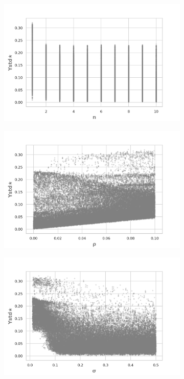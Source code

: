 \documentclass{article}
\begin{document}
\begin{figure}[H]
    \begin{subfigure}[b]{0.45\textwidth}
      \includegraphics[width=\textwidth]{img/regressionYstd*n.png}
    \end{subfigure}
    \begin{subfigure}[b]{0.45\textwidth}
      \includegraphics[width=\textwidth]{img/regressionYstd*rho.png}
     \end{subfigure}
     \begin{subfigure}[b]{0.5\textwidth}
       \includegraphics[width=\textwidth]{img/regressionYstd*sigma.png}

\end{subfigure}
\end{figure}
\end{document}
